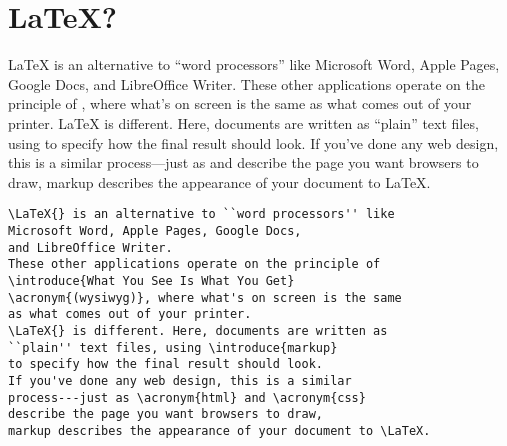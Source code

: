 \section{\texorpdfstring{\LaTeX}{LaTeX}?}

\LaTeX{} is an alternative to ``word processors'' like
Microsoft Word, Apple Pages, Google Docs,
and LibreOffice Writer.
These other applications operate on the principle of
, where what's on screen is the same
as what comes out of your printer.
\LaTeX{} is different. Here, documents are written as
``plain'' text files, using 
to specify how the final result should look.
If you've done any web design, this is a similar
process---just as  and 
describe the page you want browsers to draw,
markup describes the appearance of your document to \LaTeX.

\begin{samepage}
\begin{leftfigure}
\begin{lstlisting}
\LaTeX{} is an alternative to ``word processors'' like
Microsoft Word, Apple Pages, Google Docs,
and LibreOffice Writer.
These other applications operate on the principle of
\introduce{What You See Is What You Get}
\acronym{(wysiwyg)}, where what's on screen is the same
as what comes out of your printer.
\LaTeX{} is different. Here, documents are written as
``plain'' text files, using \introduce{markup}
to specify how the final result should look.
If you've done any web design, this is a similar
process---just as \acronym{html} and \acronym{css}
describe the page you want browsers to draw,
markup describes the appearance of your document to \LaTeX.
\end{lstlisting}
\end{leftfigure}
\end{samepage}


